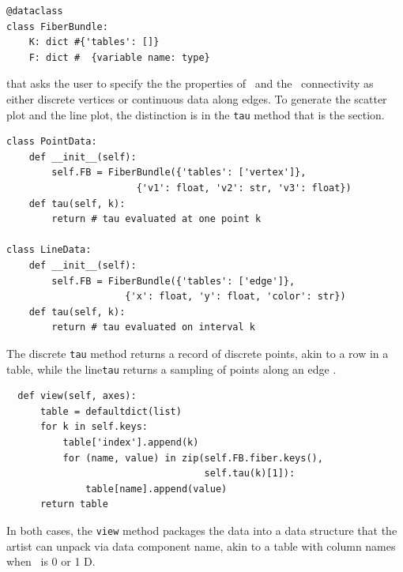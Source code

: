 \documentclass[../main.tex]{subfiles}
\begin{document}
\begin{verbatim}
@dataclass
class FiberBundle:
    K: dict #{'tables': []}
    F: dict #  {variable name: type}
\end{verbatim}
that asks the user to specify the the properties of \dfiber\ and the \dbase\ connectivity as either discrete vertices or continuous data along edges. To generate the scatter plot and the line plot, the distinction is in the \texttt{tau} method that is the section. 
\begin{verbatim}
class PointData:     
    def __init__(self):
        self.FB = FiberBundle({'tables': ['vertex']},  
                       {'v1': float, 'v2': str, 'v3': float})
    def tau(self, k):
        return # tau evaluated at one point k

class LineData:
    def __init__(self):
        self.FB = FiberBundle({'tables': ['edge']},  
                     {'x': float, 'y': float, 'color': str})
    def tau(self, k):
        return # tau evaluated on interval k
\end{verbatim}
The discrete \texttt{tau} method returns a record of discrete points, akin to a row in a table, while the line\texttt{tau} returns a sampling of points along an edge \dbasepoint.
\begin{verbatim}
  def view(self, axes):
      table = defaultdict(list)
      for k in self.keys:
          table['index'].append(k)
          for (name, value) in zip(self.FB.fiber.keys(), 
                                   self.tau(k)[1]):
              table[name].append(value)
      return table
\end{verbatim}
In both cases, the \texttt{view} method packages the data into a data structure that the artist can unpack via data component name, akin to a table with column names when \dbase\ is 0 or 1 D. 
\end{document}
